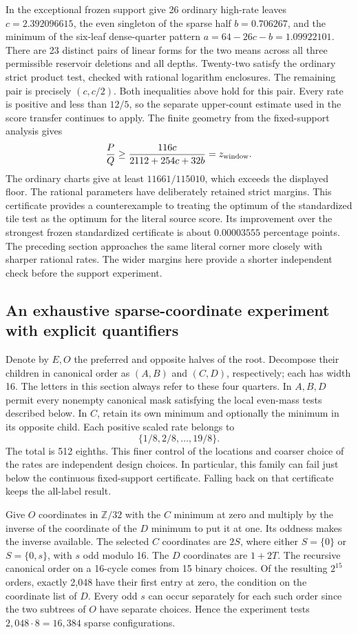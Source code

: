 In the exceptional frozen support give 26 ordinary high-rate leaves \(c=2.392096615\), the even singleton of the sparse half \(b=0.706267\), and the minimum of the six-leaf dense-quarter pattern \(a=64-26c-b=1.09922101\). There are 23 distinct pairs of linear forms for the two means across all three permissible reservoir deletions and all depths. Twenty-two satisfy the ordinary strict product test, checked with rational logarithm enclosures. The remaining pair is precisely \((c,c/2)\). Both inequalities above hold for this pair. Every rate is positive and less than \(12/5\), so the separate upper-count estimate used in the score transfer continues to apply. The finite geometry from the fixed-support analysis gives
\[
                 \frac PQ\ge\frac{116c}{2112+254c+32b}
                    =z_{\rm window}.
\]
The ordinary charts give at least \(11661/115010\), which exceeds the displayed floor. The rational parameters have deliberately retained strict margins. This certificate provides a counterexample to treating the optimum of the standardized tile test as the optimum for the literal source score. Its improvement over the strongest frozen standardized certificate is about \(0.00003555\) percentage points. The preceding section approaches the same literal corner more closely with sharper rational rates. The wider margins here provide a shorter independent check before the support experiment.

\subsection{An exhaustive sparse-coordinate experiment with explicit quantifiers}

Denote by \(E,O\) the preferred and opposite halves of the root. Decompose their children in canonical order as \((A,B)\) and \((C,D)\), respectively; each has width 16. The letters in this section always refer to these four quarters. In \(A,B,D\) permit every nonempty canonical mask satisfying the local even-mass tests described below. In \(C\), retain its own minimum and optionally the minimum in its opposite child. Each positive scaled rate belongs to
\[
            \{1/8,2/8,\ldots,19/8\}.
\]
The total is 512 eighths. This finer control of the locations and coarser choice of the rates are independent design choices. In particular, this family can fail just below the continuous fixed-support certificate. Falling back on that certificate keeps the all-label result.

Give \(O\) coordinates in \(\mathbb Z/32\) with the \(C\) minimum at zero and multiply by the inverse of the coordinate of the \(D\) minimum to put it at one. Its oddness makes the inverse available. The selected \(C\) coordinates are \(2S\), where either \(S=\{0\}\) or \(S=\{0,s\}\), with \(s\) odd modulo 16. The \(D\) coordinates are \(1+2T\). The recursive canonical order on a 16-cycle comes from 15 binary choices. Of the resulting \(2^{15}\) orders, exactly 2,048 have their first entry at zero, the condition on the coordinate list of \(D\). Every odd \(s\) can occur separately for each such order since the two subtrees of \(O\) have separate choices. Hence the experiment tests \(2{,}048\cdot8=16{,}384\) sparse configurations.

